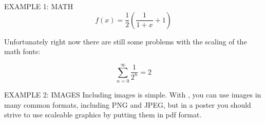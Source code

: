 \documentclass[final]{beamer}
\begin{document}
\begin{frame}[t, fragile]
\begin{columns}[T]
\begin{column}{0.32\linewidth}
\begin{block}{EXAMPLE 1: MATH}
	\begin{equation}
		f(x) = \frac{1}{2}\left(\frac{1}{1+x} + 1\right)
	\end{equation}	

	Unfortunately right now there are still some problems with the scaling of the math fonts:

	\begin{equation}
		\sum_{n=0}^\infty \frac{1}{2^n} = 2
	\end{equation}
	


\end{block}
	
	
\begin{block}{EXAMPLE 2: IMAGES}
	Including images is simple. With \pdfLaTeX, you can use images in many common formats, including PNG and JPEG, but in a poster you should strive to use scaleable graphics by putting them in pdf format.



\end{block}
	
\end{column}

\end{columns}
\end{frame}
\end{document}
